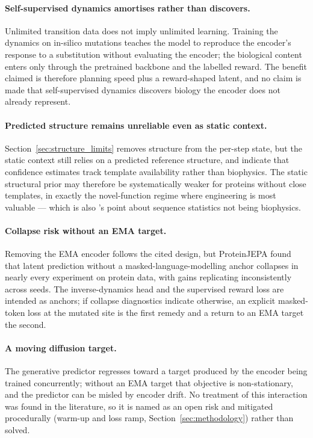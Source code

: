 \documentclass[12pt, a4paper]{article}
\begin{document}
\paragraph{Self-supervised dynamics amortises rather than discovers.} Unlimited transition data does not imply unlimited learning. Training the dynamics on in-silico mutations teaches the model to reproduce the encoder's response to a substitution without evaluating the encoder; the biological content enters only through the pretrained backbone and the labelled reward. The benefit claimed is therefore planning speed plus a reward-shaped latent, and no claim is made that self-supervised dynamics discovers biology the encoder does not already represent.

\paragraph{Predicted structure remains unreliable even as static context.} Section~\ref{sec:structure_limits} removes structure from the per-step state, but the static context still relies on a predicted reference structure, and \citet{feldman2026invariance} indicate that confidence estimates track template availability rather than biophysics. The static structural prior may therefore be systematically weaker for proteins without close templates, in exactly the novel-function regime where engineering is most valuable --- which is also \citet{wittmann2026retrospective}'s point about sequence statistics not being biophysics.

\paragraph{Collapse risk without an EMA target.} Removing the EMA encoder follows the cited design, but ProteinJEPA \citep{ofer2026proteinjepa} found that latent prediction without a masked-language-modelling anchor collapses in nearly every experiment on protein data, with gains replicating inconsistently across seeds. The inverse-dynamics head and the supervised reward loss are intended as anchors; if collapse diagnostics indicate otherwise, an explicit masked-token loss at the mutated site is the first remedy and a return to an EMA target the second.

\paragraph{A moving diffusion target.} The generative predictor regresses toward a target produced by the encoder being trained concurrently; without an EMA target that objective is non-stationary, and the predictor can be misled by encoder drift. No treatment of this interaction was found in the literature, so it is named as an open risk and mitigated procedurally (warm-up and loss ramp, Section~\ref{sec:methodology}) rather than solved.
\end{document}
